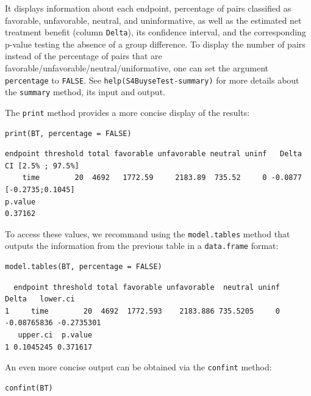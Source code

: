 \documentclass[12pt]{article}
\begin{document}
It displays information about each endpoint, percentage of pairs
classified as favorable, unfavorable, neutral, and uninformative, as
well as the estimated net treatment benefit (column \texttt{Delta}), its
confidence interval, and the corresponding p-value testing the absence
of a group difference. To display the number of pairs instead of the
percentage of pairs that are
favorable/unfavorable/neutral/uniformative, one can set the argument
\texttt{percentage} to \texttt{FALSE}. See \texttt{help(S4BuyseTest-summary)} for more
details about the \texttt{summary} method, its input and output.

\clearpage

The \texttt{print} method provides a more concise display of the results:
\lstset{language=r,label= ,caption= ,captionpos=b,numbers=none}
\begin{lstlisting}
print(BT, percentage = FALSE)
\end{lstlisting}

\begin{verbatim}
endpoint threshold total favorable unfavorable neutral uninf   Delta CI [2.5% ; 97.5%]
    time        20  4692   1772.59     2183.89  735.52     0 -0.0877  [-0.2735;0.1045]
p.value
0.37162
\end{verbatim}


\bigskip

To access these values, we recommand using the \texttt{model.tables} method
that outputs the information from the previous table in a \texttt{data.frame}
format:

\lstset{language=r,label= ,caption= ,captionpos=b,numbers=none}
\begin{lstlisting}
model.tables(BT, percentage = FALSE)
\end{lstlisting}

\begin{verbatim}
  endpoint threshold total favorable unfavorable  neutral uninf       Delta   lower.ci
1     time        20  4692  1772.593    2183.886 735.5205     0 -0.08765836 -0.2735301
   upper.ci  p.value
1 0.1045245 0.371617
\end{verbatim}


\bigskip

An even more concise output can be obtained via the \texttt{confint} method:
\lstset{language=r,label= ,caption= ,captionpos=b,numbers=none}
\begin{lstlisting}
confint(BT)
\end{lstlisting}
\end{document}
